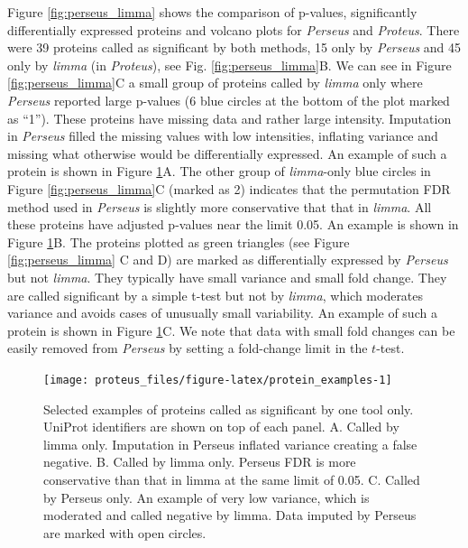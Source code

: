 \documentclass[]{article}
\begin{document}
Figure \ref{fig:perseus_limma} shows the comparison of p-values,
significantly differentially expressed proteins and volcano plots for
\emph{Perseus} and \emph{Proteus}. There were 39 proteins called as
significant by both methods, 15 only by \emph{Perseus} and 45 only by
\emph{limma} (in \emph{Proteus}), see Fig. \ref{fig:perseus_limma}B. We
can see in Figure \ref{fig:perseus_limma}C a small group of proteins
called by \emph{limma} only where \emph{Perseus} reported large p-values
(6 blue circles at the bottom of the plot marked as ``1''). These
proteins have missing data and rather large intensity. Imputation in
\emph{Perseus} filled the missing values with low intensities, inflating
variance and missing what otherwise would be differentially expressed.
An example of such a protein is shown in Figure
\ref{fig:protein_examples}A. The other group of \emph{limma}-only blue
circles in Figure \ref{fig:perseus_limma}C (marked as 2) indicates that
the permutation FDR method used in \emph{Perseus} is slightly more
conservative that that in \emph{limma}. All these proteins have adjusted
p-values near the limit 0.05. An example is shown in Figure
\ref{fig:protein_examples}B. The proteins plotted as green triangles
(see Figure \ref{fig:perseus_limma} C and D) are marked as
differentially expressed by \emph{Perseus} but not \emph{limma}. They
typically have small variance and small fold change. They are called
significant by a simple t-test but not by \emph{limma}, which moderates
variance and avoids cases of unusually small variability. An example of
such a protein is shown in Figure \ref{fig:protein_examples}C. We note
that data with small fold changes can be easily removed from
\emph{Perseus} by setting a fold-change limit in the \(t\)-test.

\begin{figure}[H]

{\centering \texttt{[image: proteus\_files/figure-latex/protein\_examples-1]} 

}

\caption{\label{fig:protein_examples}Selected examples of proteins called as significant by one tool only. UniProt identifiers are shown on top of each panel. A. Called by limma only. Imputation in Perseus inflated variance creating a false negative. B. Called by limma only. Perseus FDR is more conservative than that in limma at the same limit of 0.05. C. Called by Perseus only. An example of very low variance, which is moderated and called negative by limma. Data imputed by Perseus are marked with open circles.}\label{fig:protein_examples}
\end{figure}
\end{document}
